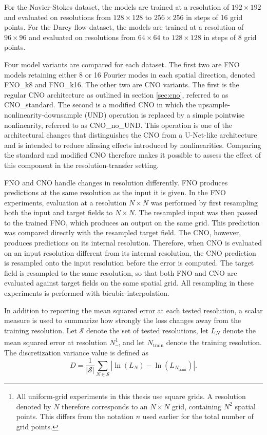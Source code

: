 For the Navier-Stokes dataset, the models are trained at a resolution of
$192 \times 192$ and evaluated on resolutions from $128 \times 128$ to
$256 \times 256$ in steps of 16 grid points. For the Darcy flow dataset,
the models are trained at a resolution of $96 \times 96$ and evaluated
on resolutions from $64 \times 64$ to $128 \times 128$ in steps of 8
grid points.

Four model variants are compared for each dataset. The first two are FNO
models retaining either 8 or 16 Fourier modes in each spatial direction,
denoted FNO\_k8 and FNO\_k16. The other two are CNO variants. The first is
the regular CNO architecture as outlined in section \ref{sec:cno}, referred to as CNO\_standard. The second is a modified CNO in which the
upsample-nonlinearity-downsample (UND) operation is replaced by a simple pointwise nonlinearity, referred to as CNO\_no\_UND. This operation is one of the architectural changes that distinguishes the CNO from a
U-Net-like architecture and is intended to reduce aliasing effects
introduced by nonlinearities. Comparing the standard and modified CNO
therefore makes it possible to assess the effect of this component in
the resolution-transfer setting.

FNO and CNO handle changes in resolution differently. FNO produces
predictions at the same resolution as the input it is given. In the FNO experiments, evaluation at a resolution \(N \times N\) was performed by first resampling both the input and target fields to \(N \times N\). The resampled input was then passed to the trained FNO, which produces an output on the same grid. This prediction was compared directly with the resampled target field. The CNO, however,
produces predictions on its internal resolution. Therefore, when CNO is
evaluated on an input resolution different from its internal resolution,
the CNO prediction is resampled onto the input resolution before the
error is computed. The target field is resampled to the same resolution,
so that both FNO and CNO are evaluated against target fields on the same
spatial grid. All resampling in these experiments is performed with
bicubic interpolation.





In addition to reporting the mean squared error at each tested resolution, a scalar measure is used to summarize how strongly the loss changes away from the training resolution. Let \(\mathcal{S}\) denote the set of tested resolutions, let \(L_N\) denote the mean squared error at resolution \(N\)\footnote{All uniform-grid experiments in this thesis use square grids. A resolution denoted by \(N\) therefore corresponds to an \(N\times N\) grid, containing \(N^2\) spatial points. This differs from the notation \(n\) used earlier for the total number of grid points.}, and let \(N_{\mathrm{train}}\) denote the training resolution. The discretization variance value is defined as
\begin{equation}
D =
\frac{1}{|\mathcal{S}|}
\sum_{N\in\mathcal{S}}
\left|
\ln(L_N)-\ln(L_{N_{\mathrm{train}}})
\right|.
\end{equation}

